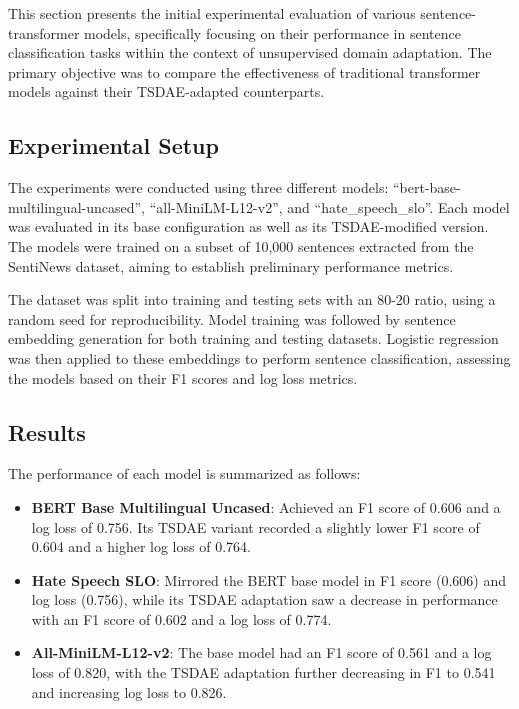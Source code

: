 \documentclass[fleqn,moreauthors,10pt]{ds_report}
\begin{document}
This section presents the initial experimental evaluation of various sentence-transformer models, specifically focusing on their performance in sentence classification tasks within the context of unsupervised domain adaptation. The primary objective was to compare the effectiveness of traditional transformer models against their TSDAE-adapted counterparts.



\subsection*{Experimental Setup}

The experiments were conducted using three different models: ``bert-base-multilingual-uncased'', ``all-MiniLM-L12-v2'', and ``hate\_speech\_slo''. Each model was evaluated in its base configuration as well as its TSDAE-modified version. The models were trained on a subset of 10,000 sentences extracted from the SentiNews dataset, aiming to establish preliminary performance metrics.

The dataset was split into training and testing sets with an 80-20 ratio, using a random seed for reproducibility. Model training was followed by sentence embedding generation for both training and testing datasets. Logistic regression was then applied to these embeddings to perform sentence classification, assessing the models based on their F1 scores and log loss metrics.

\subsection*{Results}
The performance of each model is summarized as follows:

\begin{itemize}
    \item \textbf{BERT Base Multilingual Uncased}: Achieved an F1 score of 0.606 and a log loss of 0.756. Its TSDAE variant recorded a slightly lower F1 score of 0.604 and a higher log loss of 0.764.
    \item \textbf{Hate Speech SLO}: Mirrored the BERT base model in F1 score (0.606) and log loss (0.756), while its TSDAE adaptation saw a decrease in performance with an F1 score of 0.602 and a log loss of 0.774.
    \item \textbf{All-MiniLM-L12-v2}: The base model had an F1 score of 0.561 and a log loss of 0.820, with the TSDAE adaptation further decreasing in F1 to 0.541 and increasing log loss to 0.826.
\end{itemize}
\end{document}
